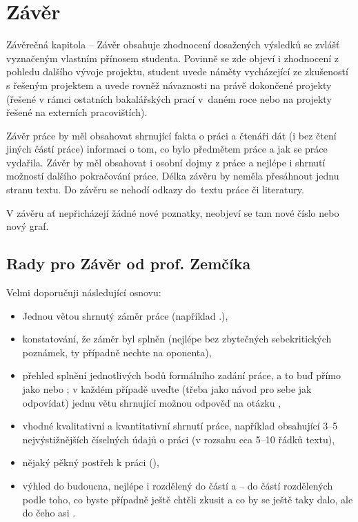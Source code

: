 \section{Závěr}
\label{zaverPrace}

Závěrečná kapitola -- Závěr obsahuje zhodnocení dosažených výsledků se zvlášť vyznačeným vlastním přínosem studenta. Povinně se zde objeví i zhodnocení z pohledu dalšího vývoje projektu, student uvede náměty vycházející ze zkušeností s řešeným projektem a uvede rovněž návaznosti na právě dokončené projekty (řešené v rámci ostatních bakalářských prací v~daném roce nebo na projekty řešené na externích pracovištích).

Závěr práce by měl obsahovat shrnující fakta o práci a čtenáři dát (i bez čtení jiných částí práce) informaci o tom, co bylo předmětem práce a jak se práce vydařila. Závěr by měl obsahovat i osobní dojmy z práce a nejlépe i shrnutí možností dalšího pokračování práce. Délka závěru by neměla přesáhnout jednu stranu textu. Do závěru se nehodí odkazy do~textu práce či literatury.

V závěru ať nepřicházejí žádné nové poznatky, neobjeví se tam nové číslo nebo nový graf.

\subsection*{Rady pro Závěr od prof. Zemčíka}

Velmi doporučuji následující osnovu:
\begin{itemize}
  \item{Jednou větou shrnutý záměr práce (například .),}
  \item{konstatování, že záměr byl splněn (nejlépe bez zbytečných sebekritických poznámek, ty případně nechte na oponenta),}
  \item{přehled splnění jednotlivých bodů formálního zadání práce, a to buď přímo jako  nebo ; v každém případě uveďte (třeba jako návod pro sebe jak odpovídat) jednu větu shrnující možnou odpověď na otázku ,}
  \item{vhodné kvalitativní a kvantitativní shrnutí práce, například obsahující 3--5 nejvýstižnějších číselných údajů o práci (v rozsahu cca 5--10 řádků textu),}
  \item{nějaký pěkný postřeh k práci (), }
  \item{výhled do budoucna, nejlépe i rozdělený do částí  a  -- do částí rozdělených podle toho, co byste případně ještě chtěli zkusit a co by se ještě taky dalo, ale do čeho asi . }
\end{itemize}

